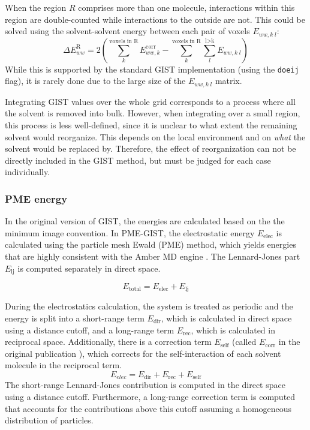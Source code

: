 \documentclass[9pt,tutorial]{livecoms}
\newcommand\inlinecode{\texttt}
\begin{document}
When the region $R$ comprises more than one molecule, interactions within this region are double-counted while interactions to the outside are not.
This could be solved using the solvent-solvent energy between each pair of voxels $E_{ww,k\;l}$:
\begin{equation}
	\Delta E^\text{R}_{ww} = 2\left(\sum_{k}^\text{voxels in R} E_{ww,k}^\text{corr}-\sum_{k}^\text{voxels in R}\sum_{l}^\text{l>k} E_{ww, k\;l}\right)
\end{equation}
While this is supported by the standard GIST implementation (using the \inlinecode{doeij} flag), it is rarely done due to the large size of the $E_{ww,k\;l}$ matrix.

Integrating GIST values over the whole grid corresponds to a process where all the solvent is removed into bulk.
However, when integrating over a small region, this process is less well-defined, since it is unclear to what extent the remaining solvent would reorganize.
This depends on the local environment and on \emph{what} the solvent would be replaced by.
Therefore, the effect of reorganization can not be directly included in the GIST method, but must be judged for each case individually.

\subsubsection{PME energy}

In the original version of GIST, the energies are calculated based on the the minimum image convention.
In PME-GIST, the electrostatic energy $E_\text{elec}$ is calculated using the particle mesh Ewald (PME) method, which yields energies that are highly consistent with the Amber MD engine \cite{Chen2021}.
The Lennard-Jones part $E_\text{lj}$ is computed separately in direct space.

\begin{equation}
	E_\text{total} = E_\text{elec} + E_\text{lj}
\end{equation}

During the electrostatics calculation, the system is treated as periodic and the energy is split into a short-range term $E_\text{dir}$, which is calculated in direct space using a distance cutoff, and a long-range term $E_\text{rec}$, which is calculated in reciprocal space.
Additionally, there is a correction term $E_\text{self}$ (called $E_\text{corr}$ in the original publication \cite{Chen2021}), which corrects for the self-interaction of each solvent molecule in the reciprocal term.
\begin{equation}
	E_\textit{elec} = E_\text{dir} + E_\text{rec} + E_\text{self}
\end{equation}
The short-range Lennard-Jones contribution is computed in the direct space using a distance cutoff.
Furthermore, a long-range correction term is computed that accounts for the contributions above this cutoff assuming a homogeneous distribution of particles.
\end{document}
